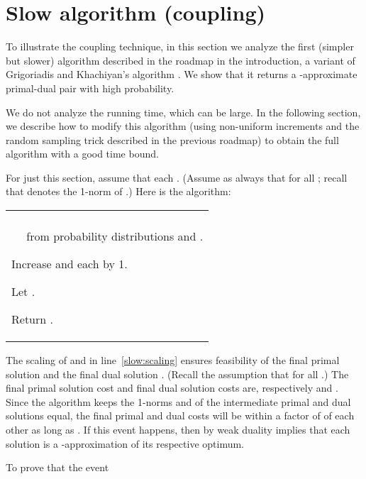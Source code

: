 \documentclass[11pt]{svjour3} \usepackage{fullpage}
\makeatletter
\newcommand{\algfont}{}
\newcommand{\tab}{\hspace*{0.13in}}
\newcounter{myline}
\newenvironment{alg}{
  \medskip
  \par
  \algfont
  \centering
    \begin{tabular}{|@{}|l|}\hline
      \begin{minipage}{0.96\linewidth}\raggedright
          \smallskip
          \begin{list}{\arabic{myline}.}{
            \usecounter{myline}
            \setlength{\listparindent}{0in}
            \setlength{\topsep}{0in}
            \setlength{\itemsep}{.013in}
            \setlength{\parsep}{.013in}
            \setlength{\rightmargin}{0in}
            \setlength{\itemindent}{0in}
\setlength{\labelsep}{0.065in}
            \setlength{\leftmargin}{0.2in}
}
          }{
        \end{list}
        \smallskip
      \end{minipage}\\\hline
    \end{tabular}
    \par
    \noindent
}
\newcommand{\A}{\item}
\newcommand{\Ahead}[1]{\item[]\hspace*{-\leftmargin}{\textrm{#1}}}
\makeatother
\begin{document}
\section{Slow algorithm (coupling)}\label{sec:slow_alg}\label{sec:alg}
To illustrate the coupling technique,
in this section we analyze the first (simpler but slower) algorithm described in the roadmap
in the introduction,
a variant of Grigoriadis and Khachiyan's algorithm \cite{Grigoriadis95Sublinear}.
We show that it returns a -approximate primal-dual pair with high probability.

We do not analyze the running time, which can be large.
In the following section, we describe how to modify this algorithm
(using non-uniform increments
and the random sampling trick described in the previous roadmap)
to obtain the full algorithm with a good time bound.

For just this section, assume that each .
(Assume as always that  for all ;
recall that  denotes the 1-norm of .)
Here is the algorithm:

\noindent
\begin{alg}
\Ahead{\normalsize{\bf slow-alg} }

\A Vectors ;
 scalar .

\A {Repeat} until :

\A\tab Let  (for all )
and  (for all ).

\A \tab Choose random indices  and  respectively
\\\tab~~ from probability distributions  and .

\A \tab Increase  and  each by 1.

\A Let .  \label{slow:scaling}

\A Return .
\end{alg}

\smallskip
The scaling of  and  in line~\ref{slow:scaling} ensures feasibility of the final primal solution  and the final dual solution .
(Recall the assumption that  for all .)
The final primal solution cost and final dual solution costs are, respectively  and .
Since the algorithm keeps the 1-norms  and  of the intermediate primal and dual solutions equal, the final primal and dual costs will be within a factor of  of each other as long as .
If this event happens, then by weak duality implies that each solution is a -approximation of its respective optimum.

To prove that the event
\end{document}
